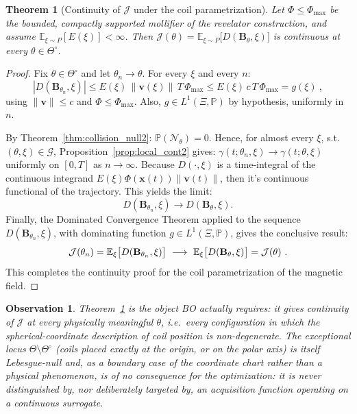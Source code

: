 \documentclass{article}
\newtheorem{obs}{Observation}
\newtheorem{thm}{Theorem}
\begin{document}
	\begin{thm}[Continuity of $\mathcal{J}$ under the coil parametrization] \label{thm:J_continuity_coils}
		Let $\Phi \le \Phi_{\max}$ be the bounded, compactly supported mollifier of the revelator construction, and assume $\mathbb{E}_{\xi \sim P}[E(\xi)] < \infty$. Then $\mathcal{J}(\theta) = \mathbb{E}_{\xi \sim P}\big[D(\mathbf{B}_\theta,\xi)\big]$ is continuous at every $\theta \in \Theta^\circ$.
	\end{thm}
	\begin{proof}
		Fix $\theta \in \Theta^\circ$ and let $\theta_n \to \theta$. For every $\xi$ and every $n$:
		\begin{equation}
			|D(\mathbf{B}_{\theta_n},\xi)| \le E(\xi)\, \|\mathbf{v}(\xi)\| \, T \, \Phi_{\max} \le E(\xi)\, c\, T\, \Phi_{\max} = g(\xi) \ ,
		\end{equation}
		using $\|\mathbf{v}\| \le c$ and $\Phi \le \Phi_{\max}$. Also, $g \in L^1(\Xi, \mathbb{P})$ by hypothesis, uniformly in $n$.
		
		By Theorem~\ref{thm:collision_null2}: $\mathbb{P}(\mathcal{N}_\theta) = 0$. Hence, for almost every $\xi$, s.t.\ $(\theta,\xi) \in \mathcal{G}$, Proposition~\ref{prop:local_cont2} gives: $\gamma(t;\theta_n,\xi) \to \gamma(t;\theta,\xi)$ uniformly on $[0,T]$ as $n \to \infty$. Because $D(\cdot,\xi)$ is a time-integral of the continuous integrand $E(\xi)\Phi(\mathbf{x}(t))\|\mathbf{v}(t)\|$, then it's continuous functional of the trajectory. This yields the limit: \begin{equation}
			D(\mathbf{B}_{\theta_n},\xi) \to D(\mathbf{B}_\theta,\xi).
		\end{equation}
		Finally, the Dominated Convergence Theorem applied to the sequence $D(\mathbf{B}_{\theta_n},\xi)$, with dominating function $g \in L^1(\Xi, \mathbb{P})$, gives the conclusive result:
		\begin{equation}
			\mathcal{J}(\theta_n) = \mathbb{E}_\xi\big[D(\mathbf{B}_{\theta_n},\xi)\big] \ \longrightarrow \ \mathbb{E}_\xi\big[D(\mathbf{B}_\theta,\xi)\big] = \mathcal{J}(\theta) \ . \qedhere
		\end{equation}
		This completes the continuity proof for the coil parametrization of the magnetic field.
	\end{proof}
	\begin{obs}
		Theorem~\ref{thm:J_continuity_coils} is the object BO actually requires: it gives continuity of $\mathcal{J}$ at every physically meaningful $\theta$, i.e.\ every configuration in which the spherical-coordinate description of coil position is non-degenerate. The exceptional locus $\Theta \setminus \Theta^\circ$ (coils placed exactly at the origin, or on the polar axis) is itself Lebesgue-null and, as a boundary case of the coordinate chart rather than a physical phenomenon, is of no consequence for the optimization: it is never distinguished by, nor deliberately targeted by, an acquisition function operating on a continuous surrogate.
	\end{obs}
\end{document}
